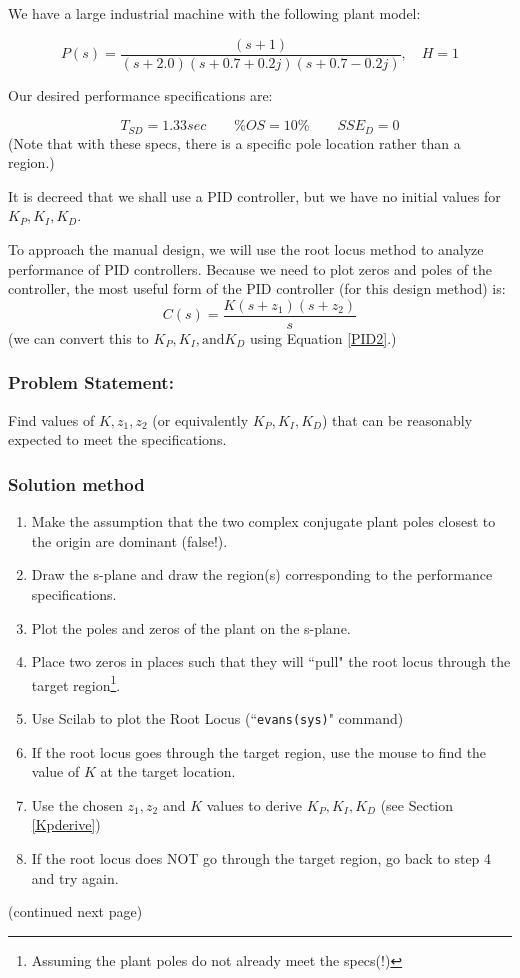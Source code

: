 \begin{Example}
We have a large industrial machine with the following plant model:

\[
P(s) = \frac {(s+1)} {(s+2.0)(s+0.7+0.2j)(s+0.7-0.2j)}, \quad H=1
\]


Our desired performance specifications are:

\[
T_{SD} = 1.33 sec  \qquad
\%OS = 10\%        \qquad
SSE_D = 0
\]
(Note that with these specs, there is a specific pole location rather than a region.)

It is decreed that we shall use a PID controller, but we have no initial values for $K_P, K_I, K_D$.

To approach the manual design, we will use the root locus method to analyze performance of PID controllers.  Because we need to plot zeros and poles of the controller,  the most useful form of the PID controller (for this design method) is:
\[
C(s) = \frac{K(s+z_1)(s+z_2)}{s}
\]
(we can convert this to $K_P, K_I, \mathrm{and} K_D$ using Equation \ref{PID2}.)

\subsubsection*{Problem Statement: }  Find values of $K, z_1, z_2$ (or equivalently $K_P, K_I, K_D$) that can be reasonably expected to meet the specifications.

\subsubsection*{Solution method}
\begin{enumerate}
 \item Make the assumption that the two complex conjugate plant poles closest to the origin are dominant (false!).
 \item Draw the s-plane and draw the region(s) corresponding to the performance specifications.


 \item Plot the poles and zeros of the plant on the s-plane.
 \item Place two zeros in places such that they will ``pull" the root locus through the target region\footnote{Assuming the plant poles do not already meet the specs(!)}.   

  \item Use Scilab to plot the Root Locus (``{\tt evans(sys)}" command)
  \item If the root locus goes through the target region, use the mouse to find the value of $K$ at the target location.
  \item Use the chosen $z_1, z_2$ and $K$ values to derive  $K_P, K_I, K_D$ (see Section \ref{Kpderive})
  \item If the root locus does NOT go through the target region, go back to step 4 and try again.
\end{enumerate}
% 
(continued next page)
\end{Example}
